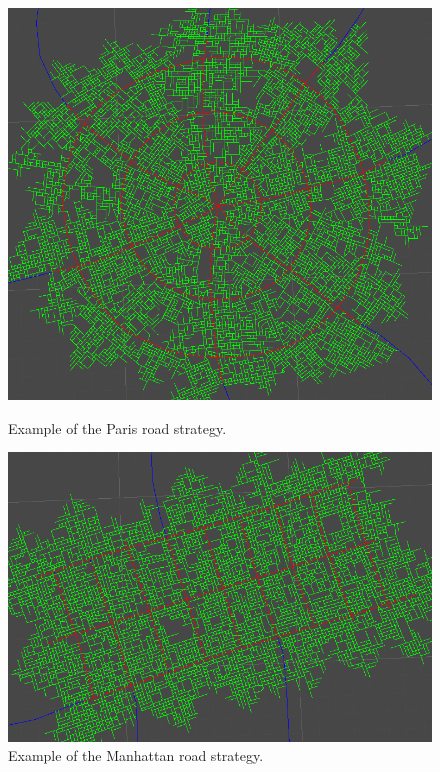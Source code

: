 \begin{figure}[H]
  \centering
  \begin{minipage}[b][][b]{.3825\textwidth}
    \centering
    \begin{minipage}[b][][b]{.9\textwidth}
      \centering
      \includegraphics[width=\textwidth]{figure/road_network_paris.png}
      \caption{Example of the Paris road strategy.}
      \label{fig:road_network_paris}
    \end{minipage}
  \end{minipage}
  \begin{minipage}[b][][b]{.5175\textwidth}
    \begin{minipage}[b][][b]{.9\textwidth}
      \centering
      \includegraphics[width=\textwidth]{figure/road_network_manhattan.png}
      \caption{Example of the Manhattan road strategy.}
      \label{fig:road_network_manhattan}
    \end{minipage}
  \end{minipage}
\end{figure}


